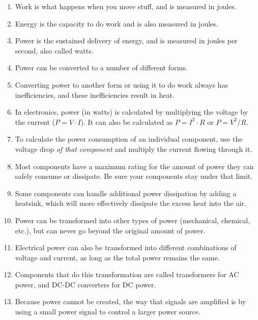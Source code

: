 \begin{enumerate}
\item Work is what happens when you move stuff, and is measured in joules.
\item Energy is the capacity to do work and is also measured in joules.
\item Power is the sustained delivery of energy, and is measured in joules per second, also called watts.
\item Power can be converted to a number of different forms.
\item Converting power to another form or using it to do work always has inefficiencies, and these inefficiencies result in heat.
\item In electronics, power (in watts) is calculated by multiplying the voltage by the current ($P = V\cdot I$).  It can also be calculated as $P = I^2\cdot R$ or $P = V^2 / R$.
\item To calculate the power consumption of an individual component, use the voltage drop \emph{of that component} and multiply the current flowing through it.
\item Most components have a maximum rating for the amount of power they can safely consume or dissipate.  Be sure your components stay under that limit.
\item Some components can handle additional power dissipation by adding a heatsink, which will more effectively dissipate the excess heat into the air.
\item Power can be transformed into other types of power (mechanical, chemical, etc.), but can never go beyond the original amount of power.
\item Electrical power can also be transformed into different combinations of voltage and current, as long as the total power remains the same.
\item Components that do this transformation are called transformers for AC power, and DC-DC converters for DC power.
\item Because power cannot be created, the way that signals are amplified is by using a small power signal to control a larger power source.
\end{enumerate}

\applysection


